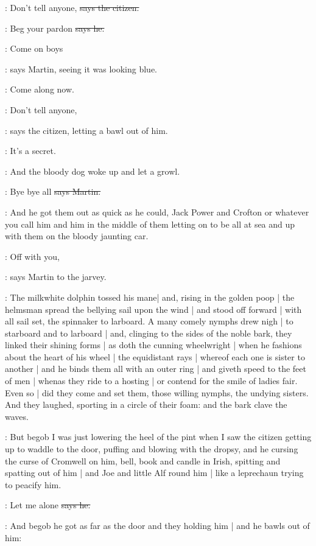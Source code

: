 \citizen:
Don't tell anyone,
\sout{says the citizen.}

\Bloom:
Beg your pardon
\sout{says he.}

\cunningham:
Come on boys

\Nq:
says Martin,
seeing it was looking blue.

\cunningham:
Come along now.

\citizen:
Don't tell anyone,

\Nq:
says the citizen,
letting a bawl out of him.

\citizen:
It's a secret.

\Nq:
And the bloody dog woke up and let a growl.

\cunningham:
Bye bye all
\sout{says Martin.}

\Nq:
And he got them out as quick as he could,
Jack Power and Crofton or whatever you call him
and him in the middle of them
letting on to be all at sea
and up with them on the bloody jaunting car.

\cunningham:
Off with you,

\Nq:
says Martin to the jarvey.

:
The milkwhite dolphin tossed his mane|
and,
rising in the golden poop |
the helmsman spread the bellying sail upon the wind |
and stood off forward |
with all sail set,
the spinnaker to larboard.
A many comely nymphs drew nigh |
to starboard and to larboard |
and,
clinging to the sides of the noble bark,
they linked their shining forms |
as doth the cunning wheelwright |
when he fashions about the heart of his wheel |
the equidistant rays |
whereof each one is sister to another |
and he binds them all with an outer ring |
and giveth speed to the feet of men |
whenas they ride to a hosting |
or contend
for the smile of ladies fair.
Even so |
did they come and set them,
those willing nymphs,
the undying sisters.
And they laughed,
sporting in a circle of their foam:
and the bark clave the waves.

\Nq:
But begob I was just lowering the heel of the pint
when I saw the citizen getting up
to waddle to the door,
puffing and blowing with the dropsy,
and he cursing the curse of Cromwell on him,
bell, book and candle
in Irish,
spitting and spatting out of him |
and Joe and little Alf round him |
like a leprechaun trying to peacify him.

\citizen:
Let me alone
\sout{says he.}

\Nq:
And begob he got as far as the door and they holding him |
and he bawls out of him:%

